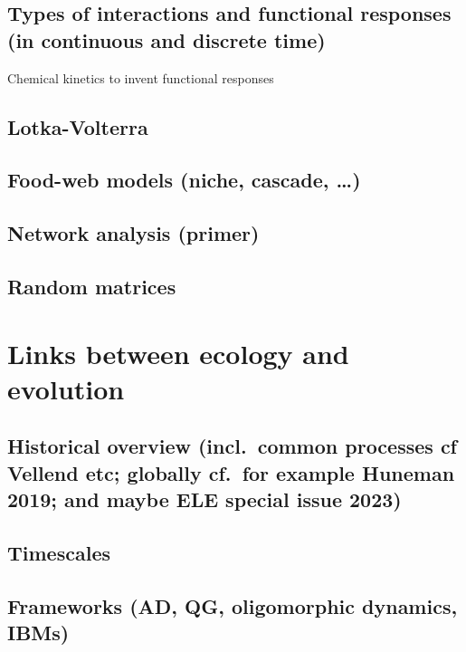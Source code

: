 \documentclass[
]{book}
\theoremstyle{definition}
\theoremstyle{definition}
\theoremstyle{definition}
\theoremstyle{definition}
\theoremstyle{remark}
\begin{document}
\subsection{Types of interactions and functional responses (in continuous and discrete time)}\label{types-of-interactions-and-functional-responses-in-continuous-and-discrete-time}

Chemical kinetics to invent functional responses

\subsection{Lotka-Volterra}\label{lotka-volterra}

\subsection{Food-web models (niche, cascade, \ldots)}\label{food-web-models-niche-cascade}

\subsection{Network analysis (primer)}\label{network-analysis-primer}

\subsection{Random matrices}\label{random-matrices}

\section{Links between ecology and evolution}\label{links-between-ecology-and-evolution}

\subsection{Historical overview (incl.~common processes cf Vellend etc; globally cf.~for example Huneman 2019; and maybe ELE special issue 2023)}\label{historical-overview-incl.-common-processes-cf-vellend-etc-globally-cf.-for-example-huneman-2019-and-maybe-ele-special-issue-2023}

\subsection{Timescales}\label{timescales}

\subsection{Frameworks (AD, QG, oligomorphic dynamics, IBMs)}\label{frameworks-ad-qg-oligomorphic-dynamics-ibms}
\end{document}
